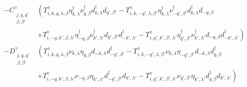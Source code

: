 \begin{align}
    - C_{\substack{j,q,q'\\ \beta, \beta'}}^{ \gamma}&\left(T^{ \gamma}_{i,k, q, \lambda, \beta}\eta^{\dag}_{k, \lambda}\nu^{\dag}_{q,\beta} d^{\dag}_{k,\lambda}d_{q',\beta'} 
    - T^{ \gamma}_{i,k, -q', \lambda, \beta'}\eta^{\dag}_{k, \lambda}\nu^{\dag}_{-q',\beta'} d^{\dag}_{k, \lambda}d_{-q, \beta} \right. \\ \nonumber
    &\left. + T^{ \gamma}_{i,-q, k', \beta, \lambda'}\eta^{\dag}_{-q,\beta} \nu^{\dag}_{k', \lambda'} d_{q',\beta'}d^{\dag}_{-k',\lambda'} 
    - T^{ \gamma}_{i,q', k', \beta', \lambda'}\eta^{\dag}_{q',\beta'} \nu^{\dag}_{k',\lambda'} d_{-q,\beta}d^{\dag}_{-k',\lambda'} \right) \\ \nonumber
    - D_{\substack{j,q,q'\\ \beta, \beta'}}^{ \gamma}&\left(T^{ \gamma}_{i,k, q, \lambda, \beta}\nu_{k, \lambda}\eta_{q,\beta} d_{-k,\lambda} d^{\dag}_{-q',\beta'}
    - T^{ \gamma}_{i,k, -q', \lambda, \beta'}\nu_{k, \lambda}\eta_{-q',\beta'} d_{-k, \lambda}d^{\dag}_{q, \beta} \right. \\ \nonumber
    &\left. + T^{ \gamma}_{i,-q, k', \beta, \lambda'}\nu_{-q,\beta} \eta_{k', \lambda'} d^{\dag}_{-q',\beta'} d_{k',\lambda'}
    - T^{ \gamma}_{i,q', k', \beta', \lambda'}\nu_{q',\beta'} \eta_{k',\lambda'} d^{\dag}_{q, \beta}d_{k', \lambda'} \right) \\ \nonumber
\end{align}